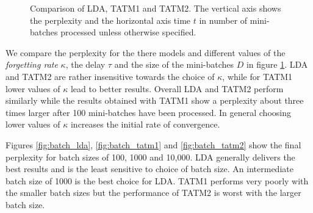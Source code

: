 \begin{figure}[ht]
{	\label{fig:batch_tatm1}
}
\caption[Optional caption for list of figures]{Comparison of LDA, TATM1 and TATM2. The vertical axis shows the perplexity and the horizontal axis time $t$ in number of mini-batches processed unless otherwise specified.}
\label{fig:evaluation}
\end{figure}
%
We compare the perplexity for the there models and different values of the \textit{forgetting rate} $\kappa$, the delay $\tau$ and the size of the mini-batches $D$ in figure \ref{fig:evaluation}. LDA and TATM2 are rather insensitive towards the choice of $\kappa$, while for TATM1 lower values of $\kappa$ lead to better results. Overall LDA and TATM2 perform similarly while the results obtained with TATM1 show a perplexity about three times larger after 100 mini-batches have been processed. In general choosing lower values of $\kappa$ increases the initial rate of convergence.

Figures \ref{fig:batch_lda}, \ref{fig:batch_tatm1} and \ref{fig:batch_tatm2} show the final perplexity for batch sizes of 100, 1000 and 10,000. LDA generally delivers the best results and is the least sensitive to choice of batch size. An intermediate batch size of 1000 is the best choice for LDA. TATM1 performs very poorly with the smaller batch sizes but the performance of TATM2 is worst with the larger batch size.